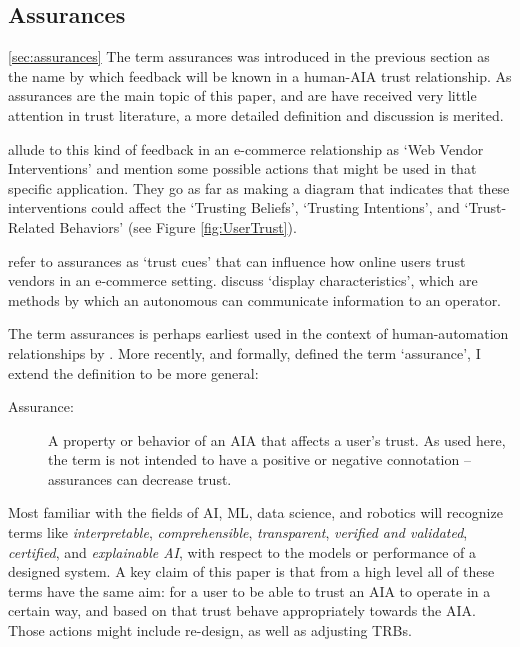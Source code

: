 \subsection{Assurances} \ref{sec:assurances}
    The term assurances was introduced in the previous section as the name by which feedback will be known in a human-AIA trust relationship. As assurances are the main topic of this paper, and are have received very little attention in trust literature, a more detailed definition and discussion is merited.

    \citet{McKnight2001-fa} allude to this kind of feedback in an e-commerce relationship as `Web Vendor Interventions' and mention some possible actions that might be used in that specific application. They go as far as making a diagram that indicates that these interventions could affect the `Trusting Beliefs', `Trusting Intentions', and `Trust-Related Behaviors' (see Figure \ref{fig:UserTrust}).

    \citet{Corritore2003-gx} refer to assurances as `trust cues' that can influence how online users trust vendors in an e-commerce setting. \citet{Lee2004-pv} discuss `display characteristics', which are methods by which an autonomous can communicate information to an operator.
    
    The term assurances is perhaps earliest used in the context of human-automation relationships by \citet{Sheridan1984-kx}. More recently, and formally, \citet{Lillard2016-yg} defined the term `assurance', I extend the definition to be more general:
    
    \begin{description}
        \item [Assurance:] A property or behavior of an AIA that affects a user's trust. As used here, the term is not intended to have a positive or negative connotation -- assurances can decrease trust.
    \end{description}

    Most familiar with the fields of AI, ML, data science, and robotics will recognize terms like \emph{interpretable}, \emph{comprehensible}, \emph{transparent}, \emph{verified and validated}, \emph{certified}, and \emph{explainable AI}, with respect to the models or performance of a designed system. A key claim of this paper is that from a high level all of these terms have the same aim: for a user to be able to trust an AIA to operate in a certain way, and based on that trust behave appropriately towards the AIA. Those actions might include re-design, as well as adjusting TRBs.
%

